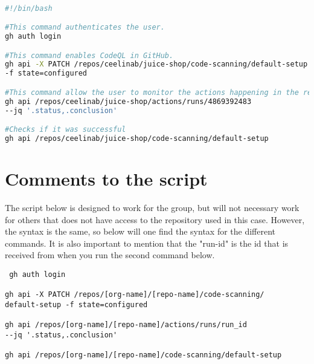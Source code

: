 \newpage
\label{EnableCodeQL}
\begin{lstlisting}[language = bash, caption=Enable CodeQL]

#!/bin/bash

#This command authenticates the user.
gh auth login

#This command enables CodeQL in GitHub. 
gh api -X PATCH /repos/ceelinab/juice-shop/code-scanning/default-setup
-f state=configured

#This command allow the user to monitor the actions happening in the repository. 
gh api /repos/ceelinab/juice-shop/actions/runs/4869392483 
--jq '.status,.conclusion'

#Checks if it was successful
gh api /repos/ceelinab/juice-shop/code-scanning/default-setup

\end{lstlisting}
\newpage
\section{Comments to the script}
The script below is designed to work for the group, but will not necessary work for others that does not have access to the repository used in this case. 
However, the syntax is the same, so below will one find the syntax for the different commands. It is also important to mention that the "run-id" is the id that is received  from when you run the second command below. 

\begin{tcolorbox}
\begin{verbatim}
 gh auth login

gh api -X PATCH /repos/[org-name]/[repo-name]/code-scanning/
default-setup -f state=configured

gh api /repos/[org-name]/[repo-name]/actions/runs/run_id 
--jq '.status,.conclusion'

gh api /repos/[org-name]/[repo-name]/code-scanning/default-setup

 
\end{verbatim}
\end{tcolorbox}